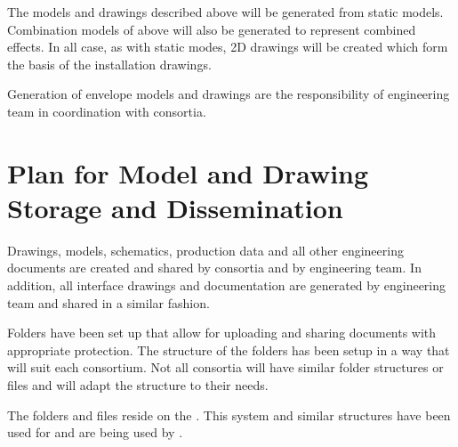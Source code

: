 The models and drawings described above will be generated from static
models. Combination models of above will also be generated to
represent combined effects. In all case, as with static modes, 2D
drawings will be created which form the basis of the installation
drawings.

Generation of envelope models and drawings are the responsibility of
 engineering team in coordination with consortia.


\section{Plan for Model and Drawing Storage and Dissemination}
\label{sec:fdsp-coord-integ-modelplan}
Drawings, models, schematics, production data and all other
engineering documents are created and shared by consortia and by
 engineering team. In addition, all interface drawings and
documentation are generated by  engineering team and shared
in a similar fashion.

Folders have been set up that allow for uploading and sharing
documents with appropriate protection. The structure of the folders
has been setup in a way that will suit each consortium. Not all
consortia will have similar folder structures or files and will adapt
the structure to their needs.

The folders and files reside on the . This system and
similar structures have been used for  and are being
used by .

